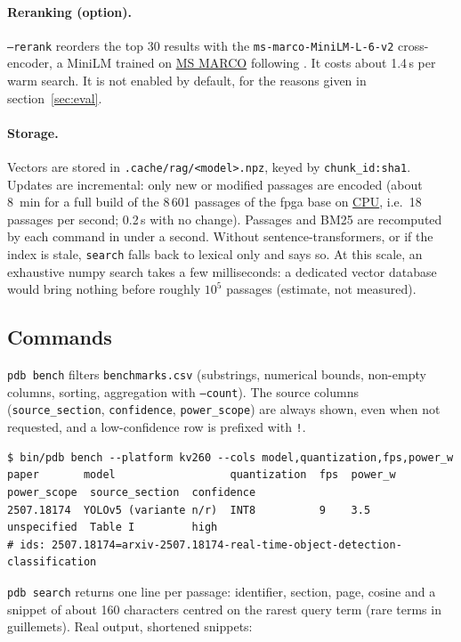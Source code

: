 \documentclass[11pt,a4paper]{article}
\newcommand{\cmd}[1]{\texttt{#1}}
\newcommand{\gl}[2]{\hyperlink{gl:#1}{\textcolor{glcolor}{#2}}}
\begin{document}
\paragraph{Reranking (option).} \cmd{--rerank} reorders the top 30 results with the
\cmd{ms-marco-MiniLM-L-6-v2} cross-encoder, a MiniLM \citep{wang2020minilm} trained on
\gl{MSMARCO}{MS MARCO} \citep{nguyen2016msmarco} following \citet{nogueira2019rerank}. It costs about 1.4\,s
per warm search. It is not enabled by default, for the reasons given in
section~\ref{sec:eval}.

\paragraph{Storage.} Vectors are stored in \cmd{.cache/rag/<model>.npz}, keyed by
\cmd{chunk\_id:sha1}. Updates are incremental: only new or modified passages are encoded
(about 8~min for a full build of the 8\,601 passages of the fpga base on \gl{CPU}{CPU}, i.e.\ 18
passages per second; 0.2\,s with no change). Passages and BM25 are recomputed by each command
in under a second. Without sentence-transformers, or if the index is stale, \cmd{search} falls
back to lexical only and says so. At this scale, an exhaustive numpy search takes a few
milliseconds: a dedicated vector database would bring nothing before roughly $10^5$ passages
(estimate, not measured).

\subsection{Commands}

\cmd{pdb bench} filters \cmd{benchmarks.csv} (substrings, numerical bounds, non-empty columns,
sorting, aggregation with \cmd{--count}). The source columns (\cmd{source\_section},
\cmd{confidence}, \cmd{power\_scope}) are always shown, even when not requested, and a
low-confidence row is prefixed with \cmd{!}.

\begin{lstlisting}
$ bin/pdb bench --platform kv260 --cols model,quantization,fps,power_w
paper       model                  quantization  fps  power_w  power_scope  source_section  confidence
2507.18174  YOLOv5 (variante n/r)  INT8          9    3.5      unspecified  Table I         high
# ids: 2507.18174=arxiv-2507.18174-real-time-object-detection-classification
\end{lstlisting}

\cmd{pdb search} returns one line per passage: identifier, section, page, cosine and a
snippet of about 160 characters centred on the rarest query term (rare terms in guillemets).
Real output, shortened snippets:
\end{document}
